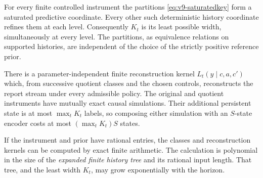 \begin{theorem}
\label{thm:v9-saturation}
For every finite controlled instrument the partitions
\eqref{eq:v9-saturatedkey} form a saturated predictive coordinate. Every
other such deterministic history coordinate refines them at each level.
Consequently $K_t$ is its least possible width, simultaneously at every
level. The partitions, as equivalence relations on supported histories,
are independent of the choice of the strictly positive reference prior.

There is a parameter-independent finite reconstruction kernel
$L_t(y\mid c,a,c')$ which, from successive quotient classes and the
chosen controls, reconstructs the report stream under every admissible
policy. The original and quotient instruments have mutually exact
causal simulations. Their additional persistent state is at most
$\max_tK_t$ labels, so composing either simulation with an $S$-state
encoder costs at most $(\max_tK_t)S$ states.

If the instrument and prior have rational entries, the classes and
reconstruction kernels can be computed by exact finite arithmetic.
The calculation is polynomial in the size of the \emph{expanded finite
history tree} and its rational input length. That tree, and the least
width $K_t$, may grow exponentially with the horizon.
\end{theorem}
